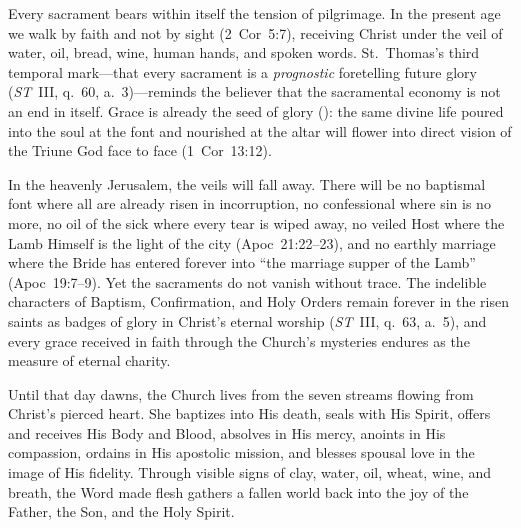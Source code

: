 Every sacrament bears within itself the tension of pilgrimage. In the present age we walk by faith and not by sight (2~Cor~5:7), receiving Christ under the veil of water, oil, bread, wine, human hands, and spoken words. St.~Thomas's third temporal mark---that every sacrament is a \emph{prognostic} foretelling future glory (\emph{ST}~III, q.~60, a.~3)---reminds the believer that the sacramental economy is not an end in itself. Grace is already the seed of glory (): the same divine life poured into the soul at the font and nourished at the altar will flower into direct vision of the Triune God face to face (1~Cor~13:12).

In the heavenly Jerusalem, the veils will fall away. There will be no baptismal font where all are already risen in incorruption, no confessional where sin is no more, no oil of the sick where every tear is wiped away, no veiled Host where the Lamb Himself is the light of the city (Apoc~21:22--23), and no earthly marriage where the Bride has entered forever into ``the marriage supper of the Lamb'' (Apoc~19:7--9). Yet the sacraments do not vanish without trace. The indelible characters of Baptism, Confirmation, and Holy Orders remain forever in the risen saints as badges of glory in Christ's eternal worship (\emph{ST}~III, q.~63, a.~5), and every grace received in faith through the Church's mysteries endures as the measure of eternal charity.

Until that day dawns, the Church lives from the seven streams flowing from Christ's pierced heart. She baptizes into His death, seals with His Spirit, offers and receives His Body and Blood, absolves in His mercy, anoints in His compassion, ordains in His apostolic mission, and blesses spousal love in the image of His fidelity. Through visible signs of clay, water, oil, wheat, wine, and breath, the Word made flesh gathers a fallen world back into the joy of the Father, the Son, and the Holy Spirit.
